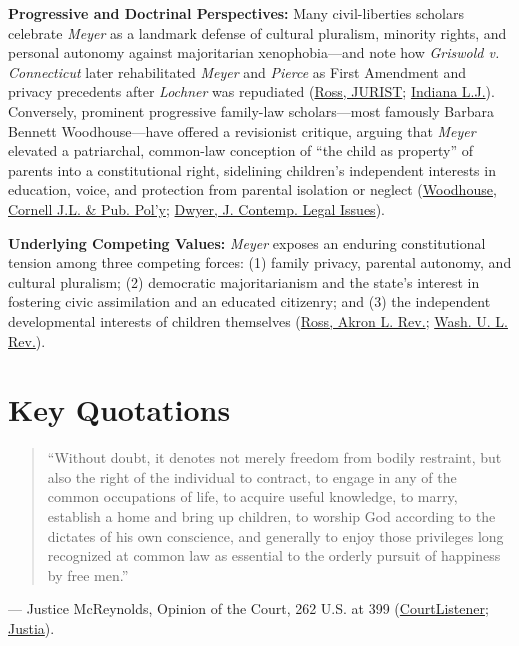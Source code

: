 \documentclass[12pt]{article}
\begin{document}
\textbf{Progressive and Doctrinal Perspectives:} Many civil-liberties scholars celebrate \textit{Meyer} as a landmark defense of cultural pluralism, minority rights, and personal autonomy against majoritarian xenophobia---and note how \textit{Griswold v. Connecticut} later rehabilitated \textit{Meyer} and \textit{Pierce} as First Amendment and privacy precedents after \textit{Lochner} was repudiated (\href{https://www.jurist.org/commentary/2023/06/meyer-v-nebraska/}{Ross, JURIST}; \href{https://www.repository.law.indiana.edu/cgi/viewcontent.cgi?article=2021&context=ilj}{Indiana L.J.}). Conversely, prominent progressive family-law scholars---most famously Barbara Bennett Woodhouse---have offered a revisionist critique, arguing that \textit{Meyer} elevated a patriarchal, common-law conception of ``the child as property'' of parents into a constitutional right, sidelining children's independent interests in education, voice, and protection from parental isolation or neglect (\href{https://scholarship.law.cornell.edu/cgi/viewcontent.cgi?article=1037&context=cjlpp}{Woodhouse, Cornell J.L. \& Pub. Pol'y}; \href{https://digital.sandiego.edu/cgi/viewcontent.cgi?article=1071&context=jcli}{Dwyer, J. Contemp. Legal Issues}).

\textbf{Underlying Competing Values:} \textit{Meyer} exposes an enduring constitutional tension among three competing forces: (1) family privacy, parental autonomy, and cultural pluralism; (2) democratic majoritarianism and the state's interest in fostering civic assimilation and an educated citizenry; and (3) the independent developmental interests of children themselves (\href{https://ideaexchange.uakron.edu/cgi/viewcontent.cgi?article=1397&context=akronlawreview}{Ross, Akron L. Rev.}; \href{https://wustllawreview.org/wp-content/uploads/2025/11/14_Aceves_Final-11.10-1.pdf}{Wash. U. L. Rev.}).

\section{Key Quotations}

\begin{quote}
``Without doubt, it denotes not merely freedom from bodily restraint, but also the right of the individual to contract, to engage in any of the common occupations of life, to acquire useful knowledge, to marry, establish a home and bring up children, to worship God according to the dictates of his own conscience, and generally to enjoy those privileges long recognized at common law as essential to the orderly pursuit of happiness by free men.''
\end{quote}
\noindent --- Justice McReynolds, Opinion of the Court, 262 U.S. at 399 (\href{https://www.courtlistener.com/opinion/100233/meyer-v-nebraska/}{CourtListener}; \href{https://supreme.justia.com/cases/federal/us/262/390/}{Justia}).
\end{document}
